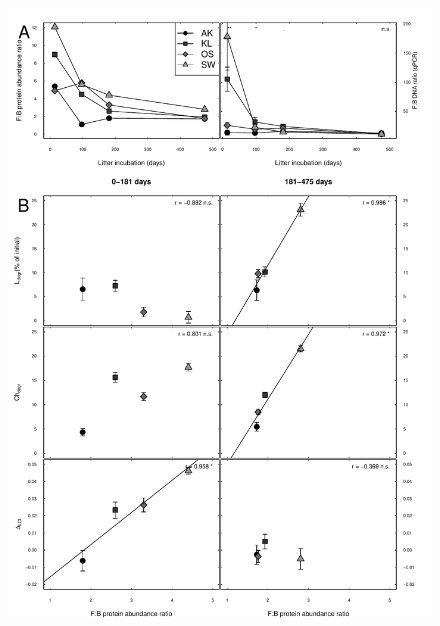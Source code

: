 \documentclass[10pt]{article}
\begin{document}
\begin{flushleft}
\begin{figure}[!ht]
\begin{center}
\includegraphics{ligpaper-f2bnew}
\end{center}
\end{figure}


\end{flushleft}
\end{document}
